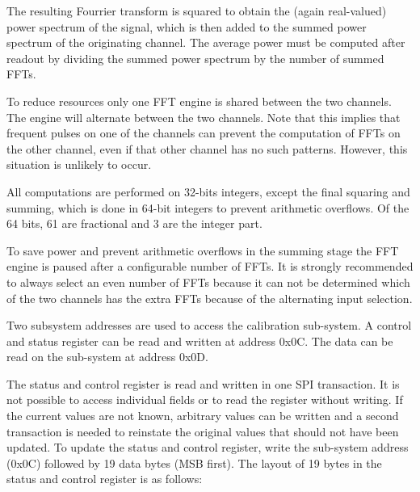 \documentclass[a4paper,indent]{paper}
\begin{document}
The resulting Fourrier transform is squared to obtain the (again real-valued) power spectrum of the signal, which is then added to the summed power spectrum of the originating channel. The average power must be computed after readout by dividing the summed power spectrum by the number of summed \acp{FFT}. 

To reduce resources only one \acs{FFT} engine is shared between the two channels. The engine will alternate between the two channels. Note that this implies that frequent pulses on one of the channels can prevent the computation of \acp{FFT} on the other channel, even if that other channel has no such patterns. However, this situation is unlikely to occur.

All computations are performed on 32-bits integers, except the final squaring and summing, which is done in 64-bit integers to prevent arithmetic overflows.
Of the 64 bits, 61 are fractional and 3 are the integer part. 


To save power and prevent arithmetic overflows in the summing stage the \acs{FFT} engine is paused after a configurable number of \acp{FFT}. It is strongly recommended to always select an even number of \acp{FFT} because it can not be determined which of the two channels has the extra \acp{FFT} because of the alternating input selection.


Two subsystem addresses are used to access the calibration sub-system. A control and status register can be read and written at address 0x0C. The data can be read on the sub-system at address 0x0D.

The status and control register is read and written in one \ac{SPI} transaction. It is not possible to access individual fields or to read the register without writing. If the current values are not known, arbitrary values can be written and a second transaction is needed to reinstate the original values that should not have been updated. To update the status and control register, write the sub-system address (0x0C) followed by 19 data bytes (MSB first). The layout of 19 bytes in the status and control register is as follows:
\end{document}

